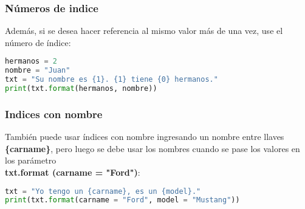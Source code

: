 \begin{frame}[fragile]
  \frametitle{Números de indice}

  Además, si se desea hacer referencia al mismo valor más de una vez,
  use el número de índice:

  \vspace{\baselineskip}
  \begin{lstlisting}[language=Python]
hermanos = 2
nombre = "Juan"
txt = "Su nombre es {1}. {1} tiene {0} hermanos."
print(txt.format(hermanos, nombre))
  \end{lstlisting}
\end{frame}

\begin{frame}[fragile]
  \frametitle{Indices con nombre}

  También puede usar índices con nombre ingresando un nombre entre
  llaves \textbf{\{carname\}}, pero luego se debe usar los nombres cuando
  se pase los valores en los parámetro \\
  \textbf{txt.format (carname = "Ford")}: 

  \vspace{\baselineskip}
  \begin{lstlisting}[language=Python]
txt = "Yo tengo un {carname}, es un {model}."
print(txt.format(carname = "Ford", model = "Mustang"))
  \end{lstlisting}
\end{frame}
